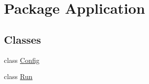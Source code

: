 \hypertarget{namespace_application}{}\section{Package Application}
\label{namespace_application}
\subsection*{Classes}
\begin{DoxyCompactItemize}
\item 
class \hyperlink{class_application_1_1_config}{Config}
\item 
class \hyperlink{class_application_1_1_run}{Run}
\end{DoxyCompactItemize}
